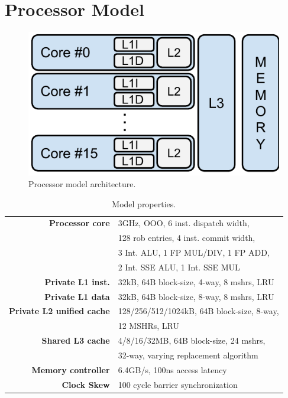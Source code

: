 \section{Processor Model}
\label{sec:methodology:processor_model}

\begin{figure}[ht]
\centering
\includegraphics[scale=.65]{figures/processor_model/processor_model}
\caption{Processor model architecture.}
\label{fig:processor_model}
\end{figure}

\begin{table}[ht]
\centering
\begin{tabular}{rl}
\toprule
\bf{Processor core}                 & 3GHz, OOO, 6 inst. dispatch width,     \\
                                    & 128 rob entries, 4 inst. commit width, \\
                                    & 3 Int. ALU, 1 FP MUL/DIV, 1 FP ADD, \\
                                    & 2 Int. SSE ALU, 1 Int. SSE MUL \\
\bf{Private L1 inst.}               & 32kB, 64B block-size, 4-way, 8 mshrs, LRU \\
\bf{Private L1 data}                & 32kB, 64B block-size, 8-way, 8 mshrs, LRU \\
\bf{Private L2 unified cache}       & 128/256/512/1024kB, 64B block-size, 8-way, \\
                                    & 12 MSHRs, LRU      \\
\bf{Shared L3 cache}                & 4/8/16/32MB, 64B block-size, 24 mshrs, \\
                                    & 32-way, varying replacement algorithm         \\
\bf{Memory controller}              & 6.4GB/s, 100ns access latency         \\
\bf{Clock Skew}                     & 100 cycle barrier synchronization        \\
\bottomrule                             
\end{tabular}
\caption{Model properties.}
\label{tbl:processor_model:properties}
\end{table}

